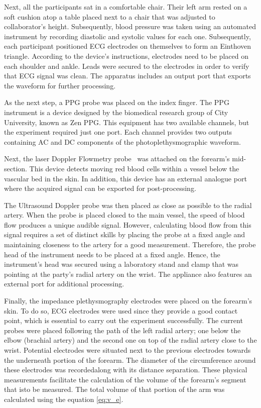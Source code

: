 Next, all the participants sat in a comfortable chair. Their left arm rested on a soft cushion atop a table placed next to a chair that was adjusted to collaborator's height. Subsequently, blood pressure was taken using an automated instrument by recording diastolic and systolic values for each one. Subsequently, each participant positioned ECG electrodes on themselves to form an Einthoven triangle. According to the device's instructions, electrodes need to be placed on each shoulder and ankle. Leads were secured to the electrodes in order to verify that ECG signal was clean. The apparatus includes an output port that exports the waveform for further processing. 

As the next step, a PPG probe was placed on the index finger. The PPG instrument is a device designed by the biomedical research group of City University, known as Zen PPG. This equipment has two available channels, but the experiment required just one port. Each channel provides two outputs containing AC and DC components of the photoplethysmographic waveform. 

Next, the laser Doppler Flowmetry probe~\cite{moor:LDF2} was attached on the forearm's mid-section. This device detects moving red blood cells within a vessel below the vascular bed in the skin. In addition, this device has an external analogue port where the acquired signal can be exported for post-processing.  

The Ultrasound Doppler probe was then placed as close as possible to the radial artery. When the probe is placed closed to the main vessel, the speed of blood flow produces a unique audible signal. However, calculating blood flow from this signal requires a set of distinct skills by placing the probe at a fixed angle and maintaining closeness to the artery for a good measurement. Therefore, the probe head of the instrument needs to be placed at a fixed angle. Hence, the instrument's head was secured using a laboratory stand and clamp that was pointing at the party's radial artery on the wrist. The appliance also features an external port for additional processing.  

Finally, the impedance plethysmography electrodes were placed on the forearm's skin. To do so, ECG electrodes were used since they provide a good contact point, which is essential to carry out the experiment successfully. The current probes were placed following the path of the left radial artery; one below the elbow (brachial artery) and the second one on top of the radial artery close to the wrist. Potential electrodes were situated next to the previous electrodes towards the underneath portion of the forearm. The diameter of the circumference around these electrodes was recordedalong with its distance separation. These physical measurements facilitate the calculation of the volume of the forearm's segment that isto be measured. The total volume of that portion of the arm was calculated using the equation \ref{eq:v_e}.

